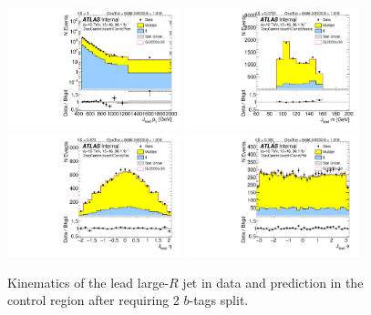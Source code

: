 \clearpage

\begin{figure}[htbp!]
\begin{center}
\includegraphics[width=0.45\textwidth,angle=-90]{figures/boosted/Control/b77_TwoTag_split_Control_leadHCand_Pt_m_1.pdf}
\includegraphics[width=0.45\textwidth,angle=-90]{figures/boosted/Control/b77_TwoTag_split_Control_leadHCand_Mass_s.pdf}\\
\includegraphics[width=0.45\textwidth,angle=-90]{figures/boosted/Control/b77_TwoTag_split_Control_leadHCand_Eta.pdf}
\includegraphics[width=0.45\textwidth,angle=-90]{figures/boosted/Control/b77_TwoTag_split_Control_leadHCand_Phi.pdf}
  \caption{Kinematics of the lead large-$R$ jet in data and prediction in the control region after requiring 2 $b$-tags split. }
  \label{fig:boosted-2bs-control-ak10-lead}
\end{center}
\end{figure}

